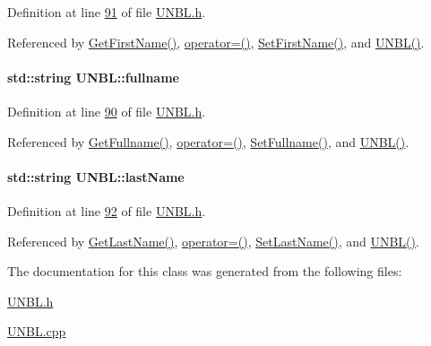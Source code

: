 Definition at line \hyperlink{_u_n_b_l_8h_source_l00091}{91} of file \hyperlink{_u_n_b_l_8h_source}{U\+N\+B\+L.\+h}.



Referenced by \hyperlink{_u_n_b_l_8cpp_source_l00091}{Get\+First\+Name()}, \hyperlink{_u_n_b_l_8h_source_l00060}{operator=()}, \hyperlink{_u_n_b_l_8cpp_source_l00087}{Set\+First\+Name()}, and \hyperlink{_u_n_b_l_8h_source_l00022}{U\+N\+B\+L()}.

\paragraph[{\texorpdfstring{fullname}{fullname}}]{\setlength{\rightskip}{0pt plus 5cm}std\+::string U\+N\+B\+L\+::fullname\hspace{0.3cm}{\ttfamily [private]}}\hypertarget{class_u_n_b_l_a67deb62f553fe1ece6feb73f12898e7a_a67deb62f553fe1ece6feb73f12898e7a}{}\label{class_u_n_b_l_a67deb62f553fe1ece6feb73f12898e7a_a67deb62f553fe1ece6feb73f12898e7a}


Definition at line \hyperlink{_u_n_b_l_8h_source_l00090}{90} of file \hyperlink{_u_n_b_l_8h_source}{U\+N\+B\+L.\+h}.



Referenced by \hyperlink{_u_n_b_l_8cpp_source_l00099}{Get\+Fullname()}, \hyperlink{_u_n_b_l_8h_source_l00060}{operator=()}, \hyperlink{_u_n_b_l_8cpp_source_l00095}{Set\+Fullname()}, and \hyperlink{_u_n_b_l_8h_source_l00022}{U\+N\+B\+L()}.

\paragraph[{\texorpdfstring{last\+Name}{lastName}}]{\setlength{\rightskip}{0pt plus 5cm}std\+::string U\+N\+B\+L\+::last\+Name\hspace{0.3cm}{\ttfamily [private]}}\hypertarget{class_u_n_b_l_a3f42790177cbe310536f53a7369ee194_a3f42790177cbe310536f53a7369ee194}{}\label{class_u_n_b_l_a3f42790177cbe310536f53a7369ee194_a3f42790177cbe310536f53a7369ee194}


Definition at line \hyperlink{_u_n_b_l_8h_source_l00092}{92} of file \hyperlink{_u_n_b_l_8h_source}{U\+N\+B\+L.\+h}.



Referenced by \hyperlink{_u_n_b_l_8cpp_source_l00083}{Get\+Last\+Name()}, \hyperlink{_u_n_b_l_8h_source_l00060}{operator=()}, \hyperlink{_u_n_b_l_8cpp_source_l00079}{Set\+Last\+Name()}, and \hyperlink{_u_n_b_l_8h_source_l00022}{U\+N\+B\+L()}.



The documentation for this class was generated from the following files\+:\begin{DoxyCompactItemize}
\item 
\hyperlink{_u_n_b_l_8h}{U\+N\+B\+L.\+h}\item 
\hyperlink{_u_n_b_l_8cpp}{U\+N\+B\+L.\+cpp}\end{DoxyCompactItemize}
